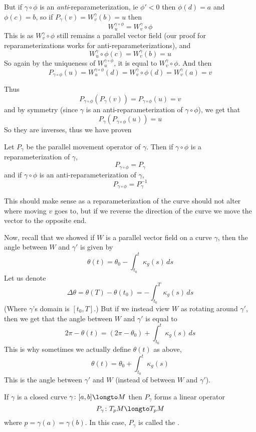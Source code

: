But if $\gamma\circ\phi$ is an \emph{anti}-reparameterization, ie $\phi'<0$ then $\phi(d)=a$ and $\phi(c)=b$, so if $P_\gamma(v)=W_v^\gamma(b)=u$ then
\[ W_u^{\gamma\circ\phi} = W_v^\gamma\circ\phi \]
This is as $W_v^\gamma\circ\phi$ still remains a parallel vector field (our proof for reparameterizations works for anti-reparameterizations), and
\[ W_u^\gamma\circ\phi(c) = W_v^\gamma(b) = u \]
So again by the uniqueness of $W_u^{\gamma\circ\phi}$, it is equal to $W_v^\gamma\circ\phi$.
And then
\[ P_{\gamma\circ\phi}(u) = W_u^{\gamma\circ\phi}(d) = W_v^\gamma\circ\phi(d) = W_v^\gamma(a) = v \]

\newpage
Thus
\[ P_{\gamma\circ\phi}(P_\gamma(v)) = P_{\gamma\circ\phi}(u) = v \]
and by symmetry (since $\gamma$ is an anti-reparameterization of $\gamma\circ\phi$), we get that
\[ P_\gamma(P_{\gamma\circ\phi}(u)) = u \]
So they are inverses, thus we have proven

\begin{prop*}

    Let $P_\gamma$ be the parallel movement operator of $\gamma$.
    Then if $\gamma\circ\phi$ is a reparameterization of $\gamma$,
    \[ P_{\gamma\circ\phi} = P_\gamma \]
    and if $\gamma\circ\phi$ is an anti-reparameterization of $\gamma$,
    \[ P_{\gamma\circ\phi} = P_\gamma^{-1} \]

\end{prop*}

This should make sense as a reparameterization of the curve should not alter where moving $v$ goes to, but if we reverse the direction of the curve we move the vector to the opposite end.

Now, recall that we showed if $W$ is a parallel vector field on a curve $\gamma$, then the angle between $W$ and $\gamma'$ is given by
\[ \theta(t) = \theta_0 - \int_{t_0}^t \kappa_g(s)\,ds \]
Let us denote
\[ \Delta\theta = \theta(T) - \theta(t_0) = -\int_{t_0}^T \kappa_g(s)\,ds \]
(Where $\gamma$'s domain is $[t_0,T]$.)
But if we instead view $W$ as rotating around $\gamma'$, then we get that the angle between $W$ and $\gamma'$ is equal to
\[ 2\pi-\theta(t) = (2\pi-\theta_0) + \int_{t_0}^t \kappa_g(s)\,ds \]
This is why sometimes we actually define $\theta(t)$ as above,
\[ \theta(t) = \theta_0 + \int_{t_0}^t \kappa_g(s) \]
This is the angle between $\gamma'$ and $W$ (instead of between $W$ and $\gamma'$).

\begin{defn*}

    If $\gamma$ is a closed curve $\gamma\colon[a,b]\longto M$ then $P_\gamma$ forms a linear operator
    \[ P_\gamma\colon T_p M\longto T_p M \]
    where $p=\gamma(a)=\gamma(b)$.
    In this case, $P_\gamma$ is called the .

\end{defn*}

